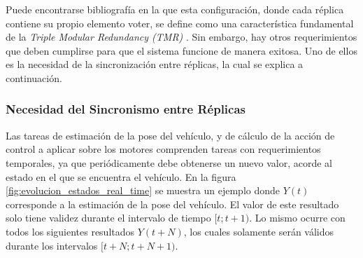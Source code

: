 Puede encontrarse bibliografía en la que esta configuración, donde cada réplica contiene su propio elemento voter, se define como una característica fundamental de la \textit{Triple Modular Redundancy (TMR)} \cite[p.~156]{kopetz-2011}. Sin embargo, hay otros requerimientos que deben cumplirse para que el sistema funcione de manera exitosa. Uno de ellos es la necesidad de la sincronización entre réplicas, la cual se explica a continuación.

\subsubsection{Necesidad del Sincronismo entre Réplicas}\label{sec:necesidad_del_sincronismo}

Las tareas de estimación de la pose del vehículo, y de cálculo de la acción de control a aplicar sobre los motores comprenden tareas con requerimientos temporales, ya que periódicamente debe obtenerse un nuevo valor, acorde al estado en el que se encuentra el vehículo. En la figura \ref{fig:evolucion_estados_real_time} se muestra un ejemplo donde $Y(t)$ corresponde a la estimación de la pose del vehículo. El valor de este resultado solo tiene validez durante el intervalo de tiempo $[t;t+1)$. Lo mismo ocurre con todos los siguientes resultados $Y(t+N)$, los cuales solamente serán válidos durante los intervalos $[t+N;t+N+1)$.


